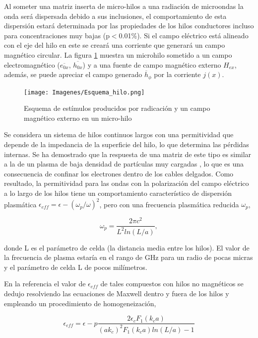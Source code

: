 \documentclass[12pt,letterpaper]{article}
\numberwithin{equation}{section}
\begin{document}
Al someter una matriz inserta de micro-hilos a una radiación de microondas la onda será dispersada debido a sus inclusiones, el comportamiento de esta dispersión estará determinada por las propiedades de los hilos conductores incluso para concentraciones muy bajas (p$<$0.01\%). Si el campo eléctrico está alineado con el eje del hilo en este se creará una corriente que generará un campo magnético circular. La figura \ref{fig:Esquema_hilo} muestra un microhilo sometido a un campo electromagnético ($\overline{e_{0x}}$, $\overline{h_{0x}}$) y a una fuente de campo magnético externo $H_{ex}$, además, se puede apreciar el campo generado $\overline{h}_{\phi}$ por la corriente $j(x)$.
 
\begin{figure}[H]
	\centering\texttt{[image: Imagenes/Esquema\_hilo.png]}\\
	\caption{Esquema de estímulos producidos por radicación y un campo magnético externo en un micro-hilo}
	\label{fig:Esquema_hilo}
\end{figure} 

Se considera un sistema de hilos continuos largos con una permitividad que depende de la impedancia de la superficie del hilo, lo que determina las pérdidas internas. Se ha demostrado que la respuesta de una matriz de este tipo es similar a la de un plasma de baja densidad de partículas muy cargadas \cite{Wire_theory_2}, lo que es una consecuencia de confinar los electrones dentro de los cables delgados. Como resultado, la permitividad para las ondas con la polarización del campo eléctrico a lo largo de los hilos tiene un comportamiento característico de dispersión plasmática $\epsilon_{eff} = \epsilon-(\omega_p/\omega)^2$, pero con una frecuencia plasmática reducida $\omega_p$,

$$\omega_p=\frac{2\pi c^2}{L^2ln(L/a)},$$

donde L es el parámetro de celda (la distancia media entre los hilos). El valor de la frecuencia de plasma estaría en el rango de GHz para un radio de pocas micras y el parámetro de celda L de pocos milímetros.

En la referencia \cite{Wire_theory_2} el valor de $\epsilon_{eff}$ de tales compuestos con hilos no magnéticos se dedujo resolviendo las ecuaciones de Maxwell dentro y fuera de los hilos y empleando un procedimiento de homogeneización,

\begin{equation}
	\epsilon_{eff}=\epsilon - p\frac{2\epsilon_c F_1(k_ca)}{(ak_c)^2F_1(k_ca)ln(L/a)-1}
	\label{permitividad}
\end{equation}
\end{document}
